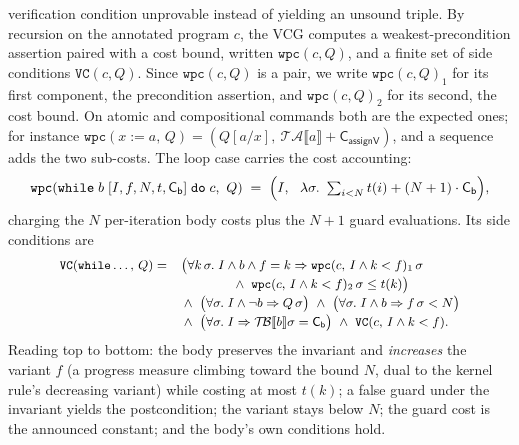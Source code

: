 \documentclass[runningheads]{llncs}
\newcommand{\State}{\sigma}
\newcommand{\tacost}[1]{\mathcal{T\!A}\llbracket #1 \rrbracket}
\newcommand{\tbcost}[1]{\mathcal{T\!B}\llbracket #1 \rrbracket}
\newcommand{\subst}[3]{#1[#2/#3]}
\newcommand{\cst}[1]{\mathsf{C_{#1}}}
\newcommand{\code}[1]{\texttt{#1}}
\begin{document}
verification condition unprovable instead of yielding an unsound triple.
By recursion on the annotated program $c$, the VCG computes a
weakest-precondition assertion paired with a cost bound, written
$\code{wpc}(c, Q)$, and a finite set of side conditions $\code{VC}(c, Q)$.
Since $\code{wpc}(c, Q)$ is a pair, we write $\code{wpc}(c, Q)_1$ for its first
component, the precondition assertion, and $\code{wpc}(c, Q)_2$ for its second, the
cost bound.
On atomic and compositional commands both are the expected ones; for instance
$\code{wpc}(x := a,\, Q) = (\subst{Q}{a}{x},\ \tacost{a} + \cst{assignV})$, and a
sequence adds the two sub-costs.
The loop case carries the cost accounting:
\[
\code{wpc}(\code{while}\;b\;[I,f,N,t,\cst{b}]\;\code{do}\;c,\ Q)
\;=\; \Bigl(I,\ \ \lambda\State.\ \textstyle\sum_{i < N} t(i) + (N+1)\cdot\cst{b}\Bigr),
\]
charging the $N$ per-iteration body costs plus the $N+1$ guard evaluations.
Its side conditions are
\[
{\small
\begin{array}{rl}
\code{VC}(\code{while}\ldots,\, Q) =
& \bigl(\forall k\,\State.\; I \wedge b \wedge f = k \Rightarrow
  \code{wpc}(c,\, I \wedge k < f)_1\,\State \\[2pt]
& \qquad\qquad {}\wedge\ \code{wpc}(c,\, I \wedge k < f)_2\,\State \le t(k)\bigr) \\[2pt]
& {}\wedge\ \bigl(\forall\State.\; I \wedge \neg b \Rightarrow Q\,\State\bigr)
  \ \wedge\ \bigl(\forall\State.\; I \wedge b \Rightarrow f\,\State < N\bigr) \\[2pt]
& {}\wedge\ \bigl(\forall\State.\; I \Rightarrow \tbcost{b}\State = \cst{b}\bigr)
  \ \wedge\ \code{VC}(c,\, I \wedge k < f).
\end{array}}
\]
Reading top to bottom: the body preserves the invariant and \emph{increases} the
variant $f$ (a progress measure climbing toward the bound $N$, dual to the kernel
rule's decreasing variant) while costing at most $t(k)$; a false guard under the
invariant yields the postcondition; the variant stays below $N$; the guard cost is
the announced constant; and the body's own conditions hold.
\end{document}
